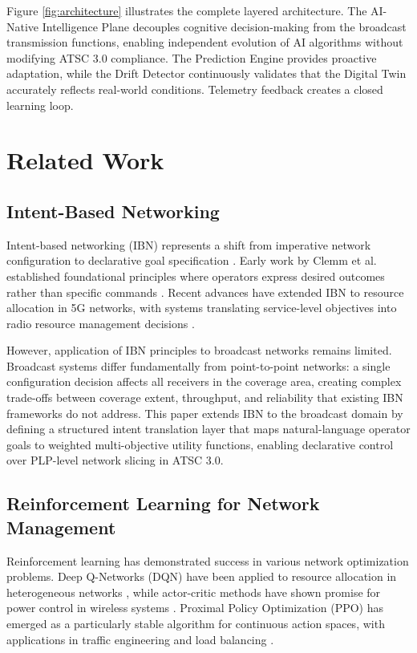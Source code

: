 \documentclass[conference]{IEEEtran}
\begin{document}
Figure \ref{fig:architecture} illustrates the complete layered architecture. The AI-Native Intelligence Plane decouples cognitive decision-making from the broadcast transmission functions, enabling independent evolution of AI algorithms without modifying ATSC 3.0 compliance. The Prediction Engine provides proactive adaptation, while the Drift Detector continuously validates that the Digital Twin accurately reflects real-world conditions. Telemetry feedback creates a closed learning loop.



\section{Related Work}

\subsection{Intent-Based Networking}

Intent-based networking (IBN) represents a shift from imperative network configuration to declarative goal specification \cite{b4}. Early work by Clemm et al. established foundational principles where operators express desired outcomes rather than specific commands \cite{b5}. Recent advances have extended IBN to resource allocation in 5G networks, with systems translating service-level objectives into radio resource management decisions \cite{b6}.

However, application of IBN principles to broadcast networks remains limited. Broadcast systems differ fundamentally from point-to-point networks: a single configuration decision affects all receivers in the coverage area, creating complex trade-offs between coverage extent, throughput, and reliability that existing IBN frameworks do not address. This paper extends IBN to the broadcast domain by defining a structured intent translation layer that maps natural-language operator goals to weighted multi-objective utility functions, enabling declarative control over PLP-level network slicing in ATSC 3.0.

\subsection{Reinforcement Learning for Network Management}

Reinforcement learning has demonstrated success in various network optimization problems. Deep Q-Networks (DQN) have been applied to resource allocation in heterogeneous networks \cite{b7}, while actor-critic methods have shown promise for power control in wireless systems \cite{b8}. Proximal Policy Optimization (PPO) has emerged as a particularly stable algorithm for continuous action spaces, with applications in traffic engineering and load balancing \cite{b9}.
\end{document}
